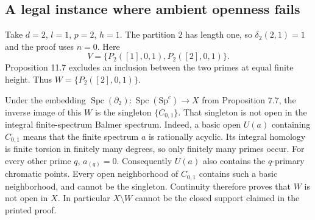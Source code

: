 \documentclass[10pt]{article}
\begin{document}
\subsection*{A legal instance where ambient openness fails}
Take \(d=2\), \(l=1\), \(p=2\), \(h=1\). The partition \(2\) has length one, so \(\delta_2(2,1)=1\) and the proof uses \(n=0\). Here \[V=\{P_2([1],0,1),P_2([2],0,1)\}.\] Proposition 11.7 excludes an inclusion between the two primes at equal finite height. Thus \(W=\{P_2([2],0,1)\}\).\par
Under the embedding \(\operatorname{Spc}(\partial_2):\operatorname{Spc}(\mathrm{Sp}^c)\to X\) from Proposition 7.7, the inverse image of this \(W\) is the singleton \(\{C_{0,1}\}\). That singleton is not open in the integral finite-spectrum Balmer spectrum. Indeed, a basic open \(U(a)\) containing \(C_{0,1}\) means that the finite spectrum \(a\) is rationally acyclic. Its integral homology is finite torsion in finitely many degrees, so only finitely many primes occur. For every other prime \(q\), \(a_{(q)}=0\). Consequently \(U(a)\) also contains the \(q\)-primary chromatic points. Every open neighborhood of \(C_{0,1}\) contains such a basic neighborhood, and cannot be the singleton. Continuity therefore proves that \(W\) is not open in \(X\). In particular \(X\setminus W\) cannot be the closed support claimed in the printed proof.\par
\end{document}
